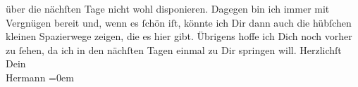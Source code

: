 \begin{ledgroupsized}[t]{13cm}
               über die nächſten Tage nicht wohl disponieren. Dagegen bin ich \label{K_L01180-2v}\label{K_L01180-2h} immer mit
               Vergnügen bereit und, wenn es ſchön iſt, könnte ich Dir dann auch die {\pb}hübſchen kleinen Spazierwege zeigen, die es hier
               gibt. Übrigens hoffe ich Dich noch vorher zu ſehen, da ich in den nächſten Tagen
               einmal zu Dir springen will.\pend
           \pstart
           Herzlichſt{\\[\baselineskip]}Dein{\\[\baselineskip]}\spacefill\mbox{Hermann}\pend
           \leftskip=0em{}
         
         \endnumbering{}\end{ledgroupsized}  \newcommand{\dateiname}{L01180}\newcommand{\titel}{Hermann Bahr an Arthur Schnitzler, 7. 10. [1901]}\newcommand{\editorInnen}{ Kurt Ifkovits,  Martin Anton Müller}
      